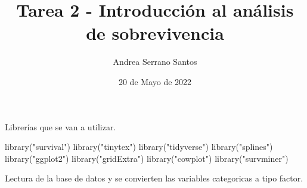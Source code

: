 \documentclass[
]{article}
\title{Tarea 2 - Introducción al análisis de sobrevivencia}
\author{Andrea Serrano Santos}
\date{20 de Mayo de 2022}
\newenvironment{Shaded}{\begin{snugshade}}{\end{snugshade}}
\newcommand{\AttributeTok}[1]{\textcolor[rgb]{0.77,0.63,0.00}{#1}}
\newcommand{\FunctionTok}[1]{\textcolor[rgb]{0.00,0.00,0.00}{#1}}
\newcommand{\NormalTok}[1]{#1}
\newcommand{\OtherTok}[1]{\textcolor[rgb]{0.56,0.35,0.01}{#1}}
\newcommand{\SpecialCharTok}[1]{\textcolor[rgb]{0.00,0.00,0.00}{#1}}
\newcommand{\StringTok}[1]{\textcolor[rgb]{0.31,0.60,0.02}{#1}}
\begin{document}
\maketitle

\begin{Shaded}
\end{Shaded}

Librerías que se van a utilizar.

\begin{Shaded}
\begin{Highlighting}[]
\FunctionTok{library}\NormalTok{(}\StringTok{"survival"}\NormalTok{)}
\FunctionTok{library}\NormalTok{(}\StringTok{"tinytex"}\NormalTok{)}
\FunctionTok{library}\NormalTok{(}\StringTok{"tidyverse"}\NormalTok{)}
\FunctionTok{library}\NormalTok{(}\StringTok{"splines"}\NormalTok{)}
\FunctionTok{library}\NormalTok{(}\StringTok{"ggplot2"}\NormalTok{)}
\FunctionTok{library}\NormalTok{(}\StringTok{"gridExtra"}\NormalTok{)}
\FunctionTok{library}\NormalTok{(}\StringTok{"cowplot"}\NormalTok{)}
\FunctionTok{library}\NormalTok{(}\StringTok{"survminer"}\NormalTok{)}
\end{Highlighting}
\end{Shaded}

Lectura de la base de datos y se convierten las variables categoricas a
tipo factor.

\begin{Shaded}
\end{Shaded}
\end{document}
